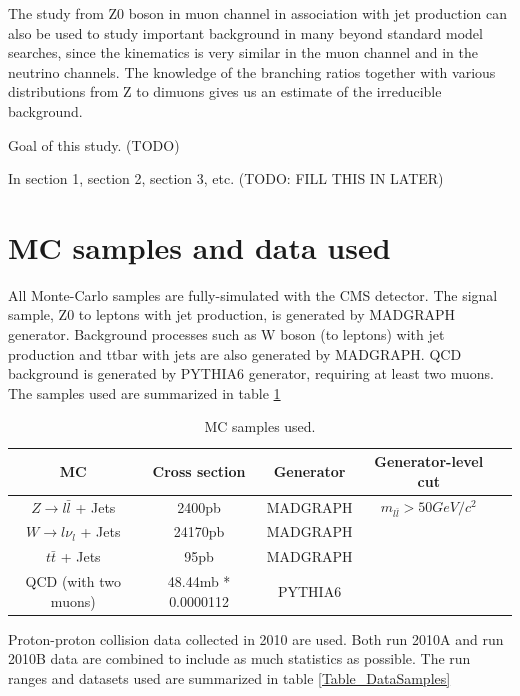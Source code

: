\documentclass{cmspaper}
\begin{document}
The study from Z0 boson in muon channel in association with jet production can also be used to study important background in many beyond standard model searches,
since the kinematics is very similar in the muon channel and in the neutrino channels.
The knowledge of the branching ratios together with various distributions from Z to dimuons gives us an estimate of the irreducible background.

Goal of this study.  (TODO)

In section 1, section 2, section 3, etc.  (TODO: FILL THIS IN LATER)


\section{MC samples and data used}


All Monte-Carlo samples are fully-simulated with the CMS detector.
The signal sample, Z0 to leptons with jet production, is generated by MADGRAPH generator.
Background processes such as W boson (to leptons) with jet production and ttbar with jets are also generated by MADGRAPH.
QCD background is generated by PYTHIA6 generator, requiring at least two muons.
The samples used are summarized in table \ref{Table_MCSamples}

\begin{table}[htbp]
   \caption{MC samples used.}
   \centering
   \begin{tabular}{|c|c|c|c|c|}
   \hline
   MC & Cross section & Generator & Generator-level cut \\\hline
   $Z \rightarrow l\bar{l}$ + Jets & 2400pb & MADGRAPH & $m_{l\bar{l}} > 50 GeV/c^2$ \\\hline
   $W \rightarrow l\nu_l$ + Jets & 24170pb & MADGRAPH &  \\\hline
   $t\bar{t}$ + Jets & 95pb & MADGRAPH &  \\\hline
   QCD (with two muons) & 48.44mb * 0.0000112 & PYTHIA6 &  \\\hline
   \end{tabular}
   \label{Table_MCSamples}
\end{table}


Proton-proton collision data collected in 2010 are used.  Both run 2010A and run 2010B data are combined to include as much statistics as possible.
The run ranges and datasets used are summarized in table \ref{Table_DataSamples}
\end{document}
